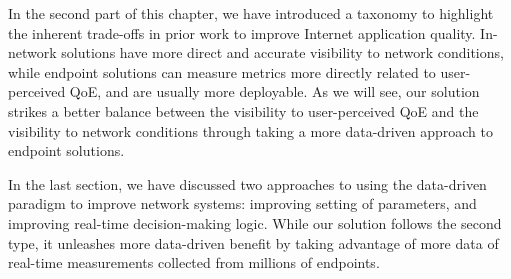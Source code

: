 In the second part of this chapter, we have introduced a taxonomy
to highlight the inherent trade-offs in prior work to improve Internet 
application quality. %
In-network solutions have more direct and accurate visibility to 
network conditions, while endpoint solutions can measure metrics
more directly related to user-perceived QoE, and are  usually more deployable.
As we will see, our solution strikes a better balance
between the visibility to user-perceived QoE and the visibility to 
network conditions through taking a more data-driven approach to 
endpoint solutions.

In the last section, we have discussed two approaches to using the
data-driven paradigm to improve network systems: improving setting
of parameters, and improving real-time decision-making logic.
While our solution follows the second type, it unleashes more 
data-driven benefit by taking advantage of more data of real-time 
measurements collected from millions of endpoints.





